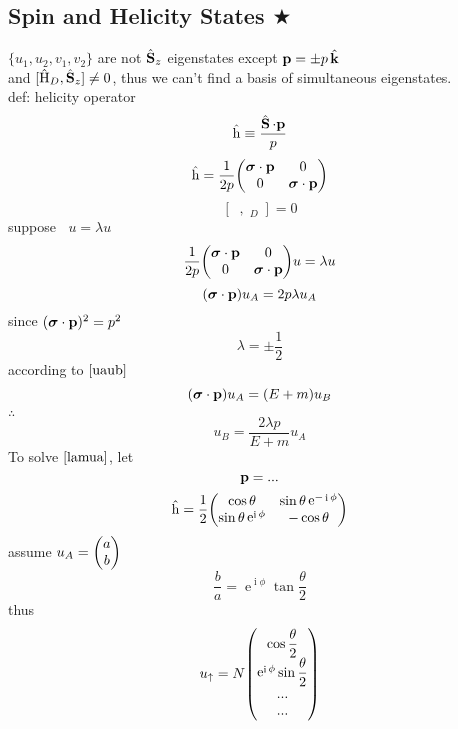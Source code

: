 \documentclass[a4paper]{article}
\DeclareMathOperator{\e}{\mathrm{e}}
\DeclareMathOperator{\I}{\mathrm{i}}
\DeclareMathOperator{\hk}{\hat{\vb{k}}}
\DeclareMathOperator{\hH}{\hat{H}}
\DeclareMathOperator{\hS}{\hat{\vb{S}}}
\DeclareMathOperator{\hh}{\hat{h}}               %
\numberwithin{equation}{section}
\begin{document}
\subsection{Spin and Helicity States $ \bigstar $}
$ \{u_1, u_2, v_1, v_2\} $ are not $ \hS_z $ eigenstates except $ \vb{p} = \pm p\hk $\\
and $ [\hH_D, \hS_z] \neq 0 $, thus we can't find a basis of simultaneous eigenstates.\\
def: helicity operator
\begin{equation}\label{key}
\hh \equiv \dfrac{\hS\cdot\vb{p}}{p}
\end{equation}
\begin{equation}\label{key}
\hh = \dfrac{1}{2p}\mqty(\bm\sigma\cdot\vb{p} & 0\\
                         0 & \bm\sigma\cdot\vb{p})
\end{equation}
\begin{equation}\label{key}
[\hh, \hH_D] = 0
\end{equation}
suppose $ \hh u = \lambda u $
\begin{equation}\label{key}
\dfrac{1}{2p}\mqty(\bm\sigma\cdot\vb{p} & 0\\
0 & \bm\sigma\cdot\vb{p}) u = \lambda u
\end{equation}
\begin{equation}\label{lamua}
(\bm\sigma\cdot\vb{p})u_A = 2p\lambda u_A
\end{equation}
since $ (\bm\sigma\cdot\vb{p})^2 = p^2 $
\begin{equation}\label{key}
\lambda = \pm\dfrac{1}{2}
\end{equation}
according to $ \eqref{uaub} $
\begin{equation}\label{key}
(\bm\sigma\cdot\vb{p})u_A = (E+ m) u_B
\end{equation}
$ \therefore $
\begin{equation}\label{key}
u_B = \dfrac{2\lambda p}{E + m}u_A
\end{equation}
To solve $ \eqref{lamua} $, let
\begin{equation}\label{key}
\vb{p} = ...
\end{equation}
\begin{equation}\label{key}
\hh = \dfrac{1}{2}\mqty(\cos\theta & \sin\theta \e^{-\I\phi}\\
                         \sin\theta \e^{\I\phi} & -\cos\theta)
\end{equation}
assume $ u_A = \mqty(a\\b) $
\begin{equation}\label{key}
\dfrac{b}{a} = \e^{\I\phi}\tan\dfrac{\theta}{2}
\end{equation}
thus
\begin{equation}\label{key}
u_\uparrow = N\mqty(\cos\dfrac{\theta}{2}\\
                    \e^{\I\phi}\sin\dfrac{\theta}{2}\\
                    ...\\
                    ...)
\end{equation}
\end{document}
